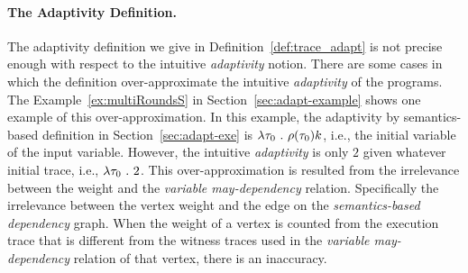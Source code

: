 \paragraph{The Adaptivity Definition.}
The adaptivity definition we give in Definition~\ref{def:trace_adapt}
is not precise enough with respect to the intuitive \emph{adaptivity} notion.
There are  some cases in which the definition over-approximate the intuitive \emph{adaptivity} of the programs.
The Example~\ref{ex:multiRoundsS} in Section~\ref{sec:adapt-example} shows one example of this over-approximation.
In this example, the adaptivity by semantics-based definition in Section~\ref{sec:adapt-exe} 
is $\lambda \mathtt{\tau}_0 ~.~ \rho(\mathtt{\tau}_0) k$, i.e., the initial variable of the input variable.
However, the intuitive \emph{adaptivity} is only $2$ given whatever initial trace, i.e., $\lambda \mathtt{\tau}_0 ~.~ 2$.
This over-approximation is resulted from the
irrelevance between the 
weight
and 
the \emph{variable may-dependency} relation.
Specifically the irrelevance between the vertex weight and the edge on the \emph{semantics-based dependency} graph.
When the 
weight of a vertex is counted from the execution trace that is different from the witness traces used in 
the \emph{variable may-dependency} relation of that vertex, there is an inaccuracy.


